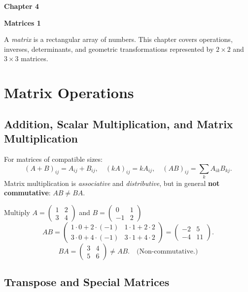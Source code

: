 \documentclass[12pt,a4paper]{article}
\theoremstyle{defstyle}
\newcommand{\chapterbanner}[2]{%
  \clearpage
  \begin{tcolorbox}[colback=chaptercol!10, colframe=chaptercol,
      left=10pt, right=10pt, top=8pt, bottom=8pt]
    {\large\bfseries\color{chaptercol} Chapter #1}\par\vspace{2pt}
    {\LARGE\bfseries #2}
  \end{tcolorbox}
  \vspace{6pt}
}
\begin{document}
\chapterbanner{4}{Matrices 1}

A \emph{matrix} is a rectangular array of numbers. This chapter covers operations, inverses, determinants, and geometric transformations represented by \(2\times2\) and \(3\times3\) matrices.

\section{Matrix Operations}

\subsection{Addition, Scalar Multiplication, and Matrix Multiplication}

\begin{result}{}{}
For matrices of compatible sizes:
\[
  (A+B)_{ij}=A_{ij}+B_{ij},\quad
  (kA)_{ij}=kA_{ij},\quad
  (AB)_{ij}=\sum_k A_{ik}B_{kj}.
\]
Matrix multiplication is \emph{associative} and \emph{distributive}, but in general \textbf{not commutative}: \(AB\neq BA\).
\end{result}

\begin{example}{Multiply $A=\begin{pmatrix}1&2\\3&4\end{pmatrix}$ and $B=\begin{pmatrix}0&1\\-1&2\end{pmatrix}$}{}
\[
  AB = \begin{pmatrix}1\cdot0+2\cdot(-1) & 1\cdot1+2\cdot2\\ 3\cdot0+4\cdot(-1) & 3\cdot1+4\cdot2\end{pmatrix}
     = \begin{pmatrix}-2 & 5\\ -4 & 11\end{pmatrix}.
\]
\[
  BA = \begin{pmatrix}3&4\\5&6\end{pmatrix} \neq AB. \quad\text{(Non-commutative.)}
\]
\end{example}

\subsection{Transpose and Special Matrices}
\end{document}
